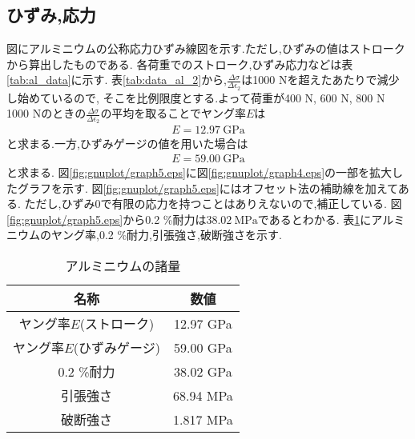 \subsection{ひずみ,応力}
図にアルミニウムの公称応力ひずみ線図を示す.ただし,ひずみの値はストロークから算出したものである.
各荷重でのストローク,ひずみ応力などは表\ref{tab:al_data}に示す.
表\ref{tab:data_al_2}から,$\frac{\Delta\sigma}{\Delta\epsilon_2}$は1000 Nを超えたあたりで減少し始めているので,
そこを比例限度とする.よって荷重が400 N, 600 N, 800 N 1000 Nのときの$\frac{\Delta\sigma}{\Delta\epsilon_2}$の平均を取ることでヤング率$E$は
\begin{align*}
  E=12.97~\si{\giga\pascal}
\end{align*}
と求まる.一方,ひずみゲージの値を用いた場合は
\begin{align*}
  E=59.00~\si{\giga\pascal}
\end{align*}
と求まる.
図\ref{fig:gnuplot/graph5.eps}に図\ref{fig:gnuplot/graph4.eps}の一部を拡大したグラフを示す.
図\ref{fig:gnuplot/graph5.eps}にはオフセット法の補助線を加えてある.
ただし,ひずみ0で有限の応力を持つことはありえないので,補正している.
図\ref{fig:gnuplot/graph5.eps}から0.2 \%耐力は$38.02~\si{\mega\pascal}$であるとわかる.
表\ref{tab:arumi_ryou}にアルミニウムのヤング率,0.2 \%耐力,引張強さ,破断強さを示す.
\begin{table}[h]
  \caption{アルミニウムの諸量}
  \label{tab:arumi_ryou}
  \centering
  \begin{tabular}{cc}
    名称&数値\\
    \hline \hline
    ヤング率$E$(ストローク)&12.97 \si{\giga\pascal}\\
    ヤング率$E$(ひずみゲージ)&59.00 \si{\giga\pascal}\\
    0.2 \%耐力&38.02 \si{\giga\pascal}\\
    引張強さ&68.94 \si{\mega\pascal}\\
    破断強さ&1.817 \si{\mega\pascal}\\
    \hline
   \end{tabular}
\end{table}